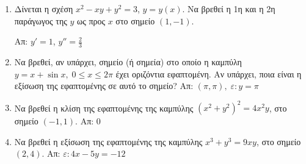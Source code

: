 \begin{enumerate}





  \item Δίνεται η σχέση $ x^{2} - xy + y^{2} = 3 $, $ y=y(x) $. Να βρεθεί η 1η
    και η 2η παράγωγος της $y$ ως προς $x$ στο σημείο $ (1,-1) $.

    \hfill Απ: $ y' = 1$, $ y'' = \frac{2}{3} $

  \item Να βρεθεί, αν υπάρχει, σημείο (ή σημεία) στο οποίο η καμπύλη 
    $ y= x+ \sin{x}, \;  0 \leq x \leq 2 \pi $ έχει οριζόντια εφαπτομένη. Αν 
    υπάρχει, ποια είναι η εξίσωση της εφαπτομένης σε αυτό το σημείο? 
    \hfill Απ: $ (\pi , \pi), \; \varepsilon: y= \pi $  

  \item Να βρεθεί η κλίση της εφαπτομένης της καμπύλης $ (x^{2}+y^{2})^{2} = 4x^{2}y $, 
    στο σημείο $ (-1,1) $.
    \hfill Απ: 0 

  \item Να βρεθεί η εξίσωση της εφαπτομένης της καμπύλης $x^{3} + y^{3}=9xy$, στο 
    σημείο $ (2,4) $.
    \hfill Απ: $ \varepsilon: 4x-5y=-12 $


\end{enumerate}
